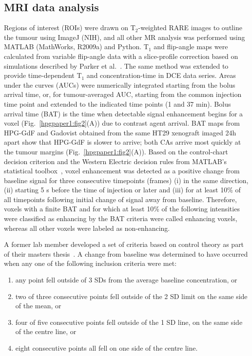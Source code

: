 \subsection{MRI data analysis}
\label{hpg_paper1_mrianalysis}
Regions of interest (ROIs) were drawn on T$_2$-weighted \acs{RARE} images to outline the tumour using ImageJ (NIH), and all other MR analysis was performed using MATLAB (MathWorks, R2009a) and Python.
T$_1$ and flip-angle maps were calculated from variable flip-angle data with a slice-profile correction based on simulations described by Parker et al.~\cite{Parker:2001wj}.
The same method was extended to provide time-dependent T$_1$ and concentration-time in DCE data series.
Areas under the curves (AUCs) were numerically integrated starting from the bolus arrival time, or, for tumour-averaged AUC, starting from the common injection time point and extended to the indicated time points (1 and 37 min).
Bolus arrival time (BAT) is the time when detectable signal enhancement begins for a voxel (Fig.~\ref{hpgpaper1:fig2}(A)) due to contrast agent arrival.
\acs{BAT} maps from \acs{HPG-GdF} and Gadovist obtained from the same HT29 xenograft imaged 24h apart show that \acs{HPG-GdF} is slower to arrive; both \acs{CA}s arrive most quickly at the tumour margins (Fig.~\ref{hpgpaper1:fig2}(A)). 
Based on the control-chart decision criterion and the Western Electric decision rules from MATLAB’s statistical toolbox~\cite{Shewhart:1931tq}, voxel enhancement was detected as a positive change from baseline signal for three consecutive timepoints (frames) (i) in the same direction, (ii) starting 5 s before the time of injection or later and (iii) for at least 10\% of all timepoints following initial change of signal away from baseline.
Therefore, voxels with a finite \acs{BAT} and for which at least 10\% of the following intensities were classified as enhancing by the \acs{BAT} criteria were called enhancing voxels, whereas all other voxels were labeled as non-enhancing.

A former lab member developed a set of criteria based on control theory as part of their masters thesis~\cite{McPhee:2012eu}.
A change from baseline was determined to have occurred when any one of the following inclusion criteria were met:

\begin{enumerate}
	\item any point fell outside of 3 SDs from the average baseline concentration, or
	\item two of three consecutive points fell outside of the 2 SD limit on the same side of the mean, or
	\item four of five consecutive points fell outside of the 1 SD line, on the same side of the centre line, or
	\item eight consecutive points all fell on one side of the centre line.
\end{enumerate}

